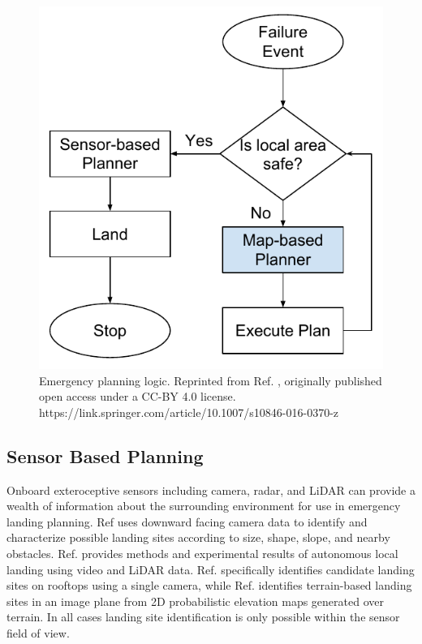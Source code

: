 \begin{figure}[ht]
\includegraphics[scale=.65]{chapter_5_mapping/imgs/meta-level-planner.pdf}
\centering
\caption[Simplified flow chart for emergency landing]{Emergency planning logic. Reprinted from Ref. \cite{ten_harmsel_emergency_2017}, originally published open access under a CC-BY 4.0 license. https://link.springer.com/article/10.1007/s10846-016-0370-z}
\label{fig:ch5_meta-level-planner}       %
\end{figure}



\subsection{Sensor Based Planning}\label{sec:ch5_local_sensor}
Onboard exteroceptive sensors including camera, radar, and LiDAR can provide a wealth of information about the surrounding environment for use in emergency landing planning. Ref \cite{warren_enabling_2015} uses downward facing camera data to identify and characterize possible landing sites according to size, shape, slope, and nearby obstacles.
Ref. \cite{theodore_flight_2006} provides methods and experimental results of autonomous local landing using video and LiDAR data. Ref. \cite{desaraju_vision-based_2015} specifically identifies candidate landing sites on rooftops using a single camera, while Ref. \cite{forster_continuous_2015} identifies terrain-based landing sites in an image plane from 2D probabilistic elevation maps generated over terrain. In all cases landing site identification is only possible within the sensor field of view.

